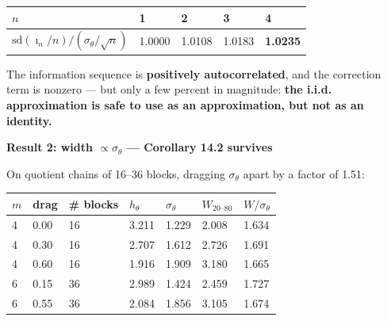 \documentclass[11pt]{article}
\begin{document}
\begin{longtable}[]{@{}lllll@{}}
\toprule
\begin{minipage}[b]{0.17\columnwidth}\raggedright
\(n\)\strut
\end{minipage} & \begin{minipage}[b]{0.17\columnwidth}\raggedright
1\strut
\end{minipage} & \begin{minipage}[b]{0.17\columnwidth}\raggedright
2\strut
\end{minipage} & \begin{minipage}[b]{0.17\columnwidth}\raggedright
3\strut
\end{minipage} & \begin{minipage}[b]{0.17\columnwidth}\raggedright
4\strut
\end{minipage}\tabularnewline
\midrule
\endhead
\begin{minipage}[t]{0.17\columnwidth}\raggedright
\(\mathrm{sd}(\imath_n/n)\big/(\sigma_\theta/\sqrt n)\)\strut
\end{minipage} & \begin{minipage}[t]{0.17\columnwidth}\raggedright
1.0000\strut
\end{minipage} & \begin{minipage}[t]{0.17\columnwidth}\raggedright
1.0108\strut
\end{minipage} & \begin{minipage}[t]{0.17\columnwidth}\raggedright
1.0183\strut
\end{minipage} & \begin{minipage}[t]{0.17\columnwidth}\raggedright
\textbf{1.0235}\strut
\end{minipage}\tabularnewline
\bottomrule
\end{longtable}

The information sequence is \textbf{positively autocorrelated}, and the correction term is nonzero --- but only a few percent in magnitude: \textbf{the i.i.d. approximation is safe to use as an approximation, but not as an identity.}

\textbf{Result 2: width \(\propto\sigma_\theta\) --- Corollary 14.2 survives}

On quotient chains of 16--36 blocks, dragging \(\sigma_\theta\) apart by a factor of 1.51:

\begin{longtable}[]{@{}lllllll@{}}
\toprule
\(m\) & drag & \# blocks & \(h_\theta\) & \(\sigma_\theta\) & \(W_{20\text{--}80}\) & \(W/\sigma_\theta\)\tabularnewline
\midrule
\endhead
4 & 0.00 & 16 & 3.211 & 1.229 & 2.008 & 1.634\tabularnewline
4 & 0.30 & 16 & 2.707 & 1.612 & 2.726 & 1.691\tabularnewline
4 & 0.60 & 16 & 1.916 & 1.909 & 3.180 & 1.665\tabularnewline
6 & 0.15 & 36 & 2.989 & 1.424 & 2.459 & 1.727\tabularnewline
6 & 0.55 & 36 & 2.084 & 1.856 & 3.105 & 1.674\tabularnewline
\bottomrule
\end{longtable}
\end{document}
